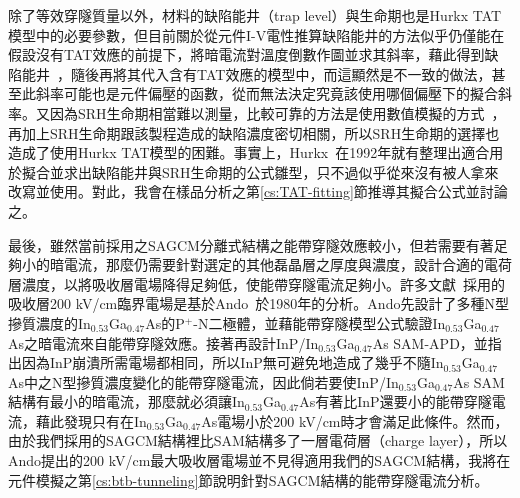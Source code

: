 除了等效穿隧質量以外，材料的缺陷能井（trap level）與生命期也是Hurkx TAT模型中的必要參數，但目前關於從元件I-V電性推算缺陷能井的方法似乎仍僅能在假設沒有TAT效應的前提下，將暗電流對溫度倒數作圖並求其斜率，藉此得到缺陷能井~\cite{wen2018origin}，隨後再將其代入含有TAT效應的模型中，而這顯然是不一致的做法，甚至此斜率可能也是元件偏壓的函數，從而無法決定究竟該使用哪個偏壓下的擬合斜率。又因為SRH生命期相當難以測量，比較可靠的方法是使用數值模擬的方式~\cite{liu1999excess}，再加上SRH生命期跟該製程造成的缺陷濃度密切相關，所以SRH生命期的選擇也造成了使用Hurkx TAT模型的困難。事實上，Hurkx~\cite{hurkx1992new}在1992年就有整理出適合用於擬合並求出缺陷能井與SRH生命期的公式雛型，只不過似乎從來沒有被人拿來改寫並使用。對此，我會在樣品分析之第\ref{cs:TAT-fitting}節推導其擬合公式並討論之。

最後，雖然當前採用之SAGCM分離式結構之能帶穿隧效應較小，但若需要有著足夠小的暗電流，那麼仍需要針對選定的其他磊晶層之厚度與濃度，設計合適的電荷層濃度，以將吸收層電場降得足夠低，使能帶穿隧電流足夠小。許多文獻~\cite{campbell2016recent}採用的吸收層200 kV/cm臨界電場是基於Ando~\cite{Ando:1980fn}於1980年的分析。Ando先設計了多種N型摻質濃度的In$_{0.53}$Ga$_{0.47}$As的P$^+$-N二極體，並藉能帶穿隧模型公式驗證In$_{0.53}$Ga$_{0.47}$As之暗電流來自能帶穿隧效應。接著再設計InP/In$_{0.53}$Ga$_{0.47}$As SAM-APD，並指出因為InP崩潰所需電場都相同，所以InP無可避免地造成了幾乎不隨In$_{0.53}$Ga$_{0.47}$As中之N型摻質濃度變化的能帶穿隧電流，因此倘若要使InP/In$_{0.53}$Ga$_{0.47}$As SAM結構有最小的暗電流，那麼就必須讓In$_{0.53}$Ga$_{0.47}$As有著比InP還要小的能帶穿隧電流，藉此發現只有在In$_{0.53}$Ga$_{0.47}$As電場小於200 kV/cm時才會滿足此條件。然而，由於我們採用的SAGCM結構裡比SAM結構多了一層電荷層（charge layer），所以Ando提出的200 kV/cm最大吸收層電場並不見得適用我們的SAGCM結構，我將在元件模擬之第\ref{cs:btb-tunneling}節說明針對SAGCM結構的能帶穿隧電流分析。
